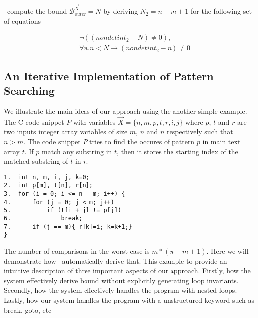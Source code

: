 \SystemName\ compute the bound $\mathcal{B}^{\vec{X}}_{outer}=N$ by deriving $N_2=n-m+1$ for the following set of equations

\begin{eqnarray*}
	&&\neg ((nondetint_2-N)\not=0), \\
    &&\forall n. n<N\rightarrow (nondetint_2-n)\not=0 
\end{eqnarray*}



\subsection{An Iterative Implementation of Pattern Searching}\label{example_details1}
We illustrate the main ideas of our approach using the another simple example. The C code snippet $P$ with variables $\vec{X}=\{n, m, p, t, r, i, j\}$ where $p$, $t$ and $r$ are two inputs integer array variables of size $m$, $n$ and $n$ respectively such that $n > m$. The code snippet $P$ tries to find the occures of pattern $p$ in main text array $t$. If $p$ match any substring in $t$, then it stores the starting index of the matched substring of $t$ in $r$.


\begin{verbatim}
1.  int n, m, i, j, k=0;
2.  int p[m], t[n], r[n];
3.  for (i = 0; i <= n - m; i++) { 
4.      for (j = 0; j < m; j++) 
5.          if (t[i + j] != p[j]) 
6.              break; 
7.      if (j == m){ r[k]=i; k=k+1;}
}
\end{verbatim}

The number of comparisons in the worst case is $m*(n-m+1)$. Here we will demonstrate how \SystemName\ automatically derive that. This example to provide an intuitive description of three important aspects of our approach.  Firstly, how the system effectively derive bound without explicitly generating loop invariants. Secondly, how the system effectively handles the program with nested loops. Lastly, how our system handles the program with a unstructured keyword such as break, goto, etc




